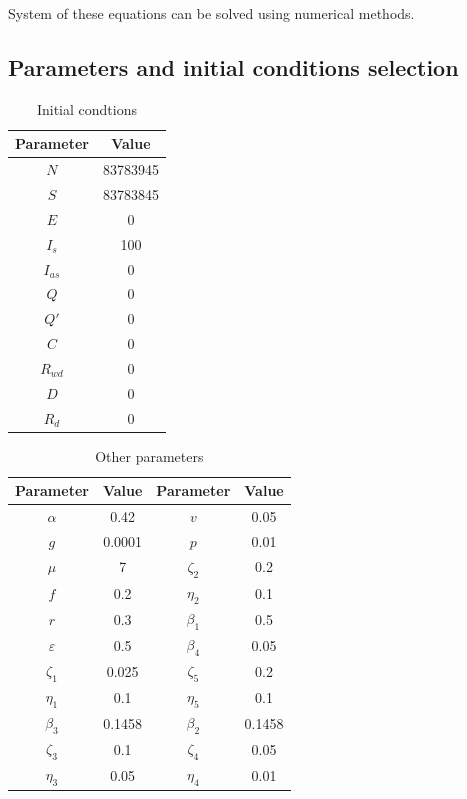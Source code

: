 \documentclass[12pt, a4paper]{article}
\begin{document}
	System of these equations can be solved using numerical methods.

	\newpage

	\subsection{Parameters and initial conditions selection}

	\begin{longtable}[c]{| c | c |}
		\caption{Initial condtions}\\

		\hline
		Parameter & Value\\
		\hline
		$N$ & 83783945\\
		$S$ & 83783845\\
		$E$ & 0\\
		$I_s$ & 100\\
		$I_{as}$ & 0\\
		$Q$ & 0\\
		$Q'$ & 0\\
		$C$ & 0\\
		$R_{wd}$ & 0\\
		$D$ & 0\\
		$R_d$ & 0\\
		\hline
		
	\end{longtable}

	\begin{longtable}[c]{| c | c | c | c |}
		\caption{Other parameters}\\

		\hline
		Parameter & Value & Parameter & Value\\
		\hline
		$\alpha$ & 0.42 & $v$ & 0.05 \\
		$g$ & 0.0001 & $p$ & 0.01\\
		$\mu$ & 7 & $\zeta_2$ & 0.2\\
		$f$ & 0.2 & $\eta_2$ & 0.1 \\
		$r$ & 0.3 & $\beta_1$ & 0.5\\
		$\varepsilon$ & 0.5 & $\beta_4$ & 0.05\\
		$\zeta_1$ & 0.025 & $\zeta_5$ & 0.2 \\
		$\eta_1$ & 0.1 & $\eta_5$ & 0.1\\
		$\beta_3$ & 0.1458 & $\beta_2$ & 0.1458\\
		$\zeta_3$ & 0.1 & $\zeta_4$ & 0.05\\
		$\eta_3$ & 0.05 & $\eta_4$ & 0.01\\
		\hline
		
	\end{longtable}
\end{document}
